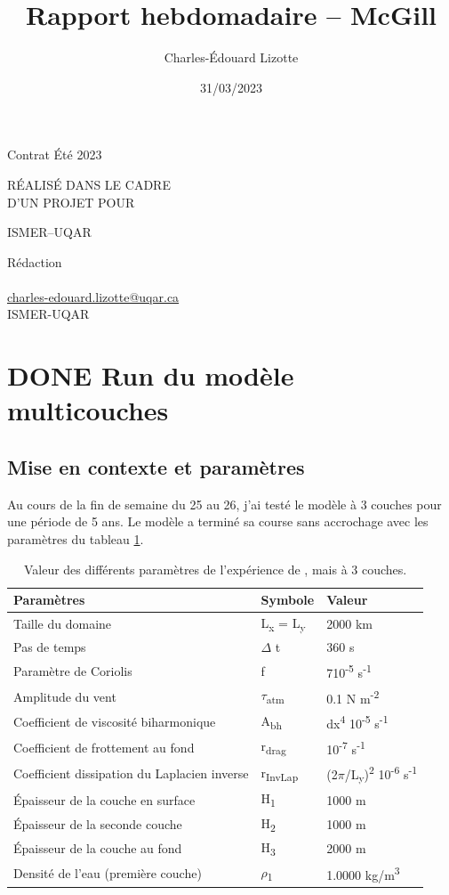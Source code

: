 \documentclass[10pt]{article}
\author{Charles-Édouard Lizotte}
\date{31/03/2023}
\title{Rapport hebdomadaire -- McGill}
\makeatletter
\numberwithin{equation}{section}
\newcommand{\mytitlepage}{
\begin{titlepage}
\begin{center}
{\Large Contrat Été 2023 \par}
\vspace{2cm}
{\Large \MakeUppercase{\thetitle} \par}
\vspace{2cm}
RÉALISÉ DANS LE CADRE\\ D'UN PROJET POUR \par
\vspace{2cm}
{\Large ISMER--UQAR \par}
\vspace{2cm}
{\thedate}
\end{center}
\vfill
Rédaction \\
{\theauthor}\\
\url{charles-edouard.lizotte@uqar.ca}\\
ISMER-UQAR
\end{titlepage}
}
\makeatother
\begin{document}
\mytitlepage
\tableofcontents\newpage


\section{{\bfseries\sffamily DONE} Run du modèle multicouches}
\label{sec:org1d8031e}
\subsection{Mise en contexte et paramètres}
\label{sec:orgcf6f4d8}
Au cours de la fin de semaine du 25 au 26, j'ai testé le modèle à 3 couches pour une période de 5 ans.
Le modèle a terminé sa course sans accrochage avec les paramètres du tableau \ref{tab:org69ba2ca}.

\begin{table}[htbp]
\caption{\label{tab:org69ba2ca}Valeur des différents paramètres de l'expérience de \citealp{chen_2021}, mais à 3 couches.}
\centering
\begin{tabular}{lll}
\hline
\hline
Paramètres & Symbole & Valeur\\[0pt]
\hline
Taille du domaine & L\textsubscript{x} = L\textsubscript{y} & 2000 km\\[0pt]
Pas de temps & \(\Delta\) t & 360 s\\[0pt]
Paramètre de Coriolis & f & 7\texttimes{}10\textsuperscript{-5} s\textsuperscript{-1}\\[0pt]
Amplitude du vent & \(\tau\)\textsubscript{atm} & 0.1 N m\textsuperscript{-2}\\[0pt]
Coefficient de viscosité biharmonique & A\textsubscript{bh} & dx\textsuperscript{4} \texttimes{}10\textsuperscript{-5} s\textsuperscript{-1}\\[0pt]
Coefficient de frottement au fond & r\textsubscript{drag} & 10\textsuperscript{-7} s\textsuperscript{-1}\\[0pt]
Coefficient dissipation du Laplacien inverse & r\textsubscript{InvLap} & (2\(\pi\)/L\textsubscript{y})\textsuperscript{2} \texttimes{} 10\textsuperscript{-6} s\textsuperscript{-1}\\[0pt]
Épaisseur de la couche en surface & H\textsubscript{1} & 1000 m\\[0pt]
Épaisseur de la seconde couche & H\textsubscript{2} & 1000 m\\[0pt]
Épaisseur de la couche au fond & H\textsubscript{3} & 2000 m\\[0pt]
Densité de l'eau (première couche) & \(\rho\)\textsubscript{1} & 1.0000 kg/m\textsuperscript{3}\\[0pt]

\end{tabular}
\end{table}
\end{document}
